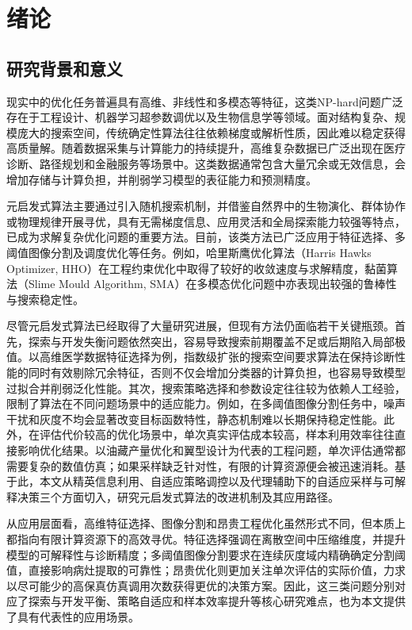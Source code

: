 \chapter{绪论}

\section{研究背景和意义}

现实中的优化任务普遍具有高维、非线性和多模态等特征，这类NP-hard问题广泛存在于工程设计\cite{ibsa_ref1}、机器学习超参数调优\cite{ibsa_ref3}以及生物信息学\cite{ibsa_ref15}等领域。面对结构复杂、规模庞大的搜索空间，传统确定性算法往往依赖梯度或解析性质，因此难以稳定获得高质量解\cite{ibsa_ref4}。随着数据采集与计算能力的持续提升，高维复杂数据已广泛出现在医疗诊断\cite{ibsa_ref11}、路径规划\cite{ibsa_ref9}和金融服务\cite{ibsa_ref8}等场景中。这类数据通常包含大量冗余或无效信息，会增加存储与计算负担，并削弱学习模型的表征能力和预测精度\cite{ibsa_ref17}。

元启发式算法主要通过引入随机搜索机制，并借鉴自然界中的生物演化、群体协作或物理规律开展寻优，具有无需梯度信息、应用灵活和全局探索能力较强等特点，已成为求解复杂优化问题的重要方法\cite{ibsa_ref16}。目前，该类方法已广泛应用于特征选择\cite{ibsa_ref50}、多阈值图像分割\cite{ibsa_ref45}及调度优化\cite{ibsa_ref48}等任务。例如，哈里斯鹰优化算法（Harris Hawks Optimizer, HHO）在工程约束优化中取得了较好的收敛速度与求解精度\cite{ibsa_ref83}，黏菌算法（Slime Mould Algorithm, SMA）在多模态优化问题中亦表现出较强的鲁棒性与搜索稳定性\cite{ibsa_ref28}。

尽管元启发式算法已经取得了大量研究进展，但现有方法仍面临若干关键瓶颈。首先，探索与开发失衡问题依然突出\cite{ibsa_ref75}，容易导致搜索前期覆盖不足或后期陷入局部极值。以高维医学数据特征选择为例，指数级扩张的搜索空间要求算法在保持诊断性能的同时有效剔除冗余特征，否则不仅会增加分类器的计算负担，也容易导致模型过拟合并削弱泛化性能。其次，搜索策略选择和参数设定往往较为依赖人工经验\cite{ibsa_ref65}，限制了算法在不同问题场景中的适应能力。例如，在多阈值图像分割任务中，噪声干扰和灰度不均会显著改变目标函数特性，静态机制难以长期保持稳定性能。此外，在评估代价较高的优化场景中，单次真实评估成本较高，样本利用效率往往直接影响优化结果\cite{he2023review}。以油藏产量优化和翼型设计为代表的工程问题，单次评估通常都需要复杂的数值仿真；如果采样缺乏针对性，有限的计算资源便会被迅速消耗。基于此，本文从精英信息利用、自适应策略调控以及代理辅助下的自适应采样与可解释决策三个方面切入，研究元启发式算法的改进机制及其应用路径。

从应用层面看，高维特征选择、图像分割和昂贵工程优化虽然形式不同，但本质上都指向有限计算资源下的高效寻优。特征选择强调在离散空间中压缩维度，并提升模型的可解释性与诊断精度\cite{ibsa_ref50}；多阈值图像分割要求在连续灰度域内精确确定分割阈值，直接影响病灶提取的可靠性\cite{sbo_ref82,sbo_ref83}；昂贵优化则更加关注单次评估的实际价值，力求以尽可能少的高保真仿真调用次数获得更优的决策方案\cite{liu2023airfoils,kumar2024optimization}。因此，这三类问题分别对应了探索与开发平衡、策略自适应和样本效率提升等核心研究难点，也为本文提供了具有代表性的应用场景。

